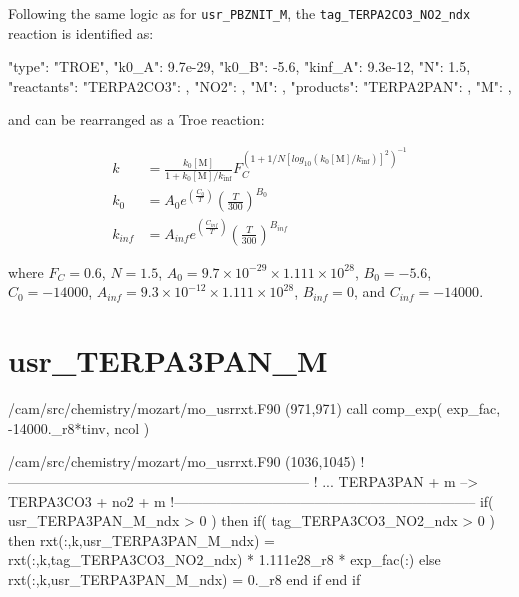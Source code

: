 \documentclass[titlepage]{article}
\begin{document}
Following the same logic as for \verb>usr_PBZNIT_M>, the \verb>tag_TERPA2CO3_NO2_ndx> reaction is identified as:

\begin{blockcode}
        {
          "type": "TROE",
          "k0_A": 9.7e-29,
          "k0_B": -5.6,
          "kinf_A": 9.3e-12,
          "N": 1.5,
          "reactants": {
            "TERPA2CO3": { },
            "NO2": { },
            "M": { }
          },
          "products": {
            "TERPA2PAN": { },
            "M": { }
          }
        },
\end{blockcode}

\noindent and can be rearranged as a Troe reaction:

\begin{equation}
\begin{split}
k & = \frac{k_0[\mbox{M}]}{1+k_0[\mbox{M}]/k_{\inf}}F_C^{(1+1/N[log_{10}(k_0[\mbox{M}]/k_{\inf})]^2)^{-1}} \\
k_0 & = A_0 e^{\left( \frac{C_0}{T} \right)} \left( \frac{T}{300} \right)^{B_0} \\
k_{inf} & = A_{inf} e^{\left( \frac{C_{inf}}{T} \right)} \left( \frac{T}{300} \right)^{B_{inf}}
\end{split}
\end{equation}

\noindent where $F_C = 0.6$, $N = 1.5$, $A_0 = 9.7 \times 10^{-29} \times 1.111 \times 10^{28}$, $B_0 = -5.6$, $C_0 = -14000$, $A_{inf} = 9.3 \times 10^{-12} \times 1.111 \times 10^{28}$, $B_{inf} = 0$, and $C_{inf} = -14000$.


\section{usr\_TERPA3PAN\_M}

\begin{blockcode}[commandchars=\\\{\}]
\color{gray}/cam/src/chemistry/mozart/mo_usrrxt.F90 (971,971)
       call comp_exp( exp_fac, -14000._r8*tinv, ncol )
\end{blockcode}

\begin{blockcode}[commandchars=\\\{\}]
\color{gray}/cam/src/chemistry/mozart/mo_usrrxt.F90 (1036,1045)
!-----------------------------------------------------------------
!       ... TERPA3PAN + m --> TERPA3CO3 + no2 + m
!-----------------------------------------------------------------
       if( usr_TERPA3PAN_M_ndx > 0 ) then
          if( tag_TERPA3CO3_NO2_ndx > 0 ) then
             rxt(:,k,usr_TERPA3PAN_M_ndx) = rxt(:,k,tag_TERPA3CO3_NO2_ndx) * 1.111e28_r8 * exp_fac(:)
          else
             rxt(:,k,usr_TERPA3PAN_M_ndx) = 0._r8
          end if
       end if
\end{blockcode}
\end{document}
